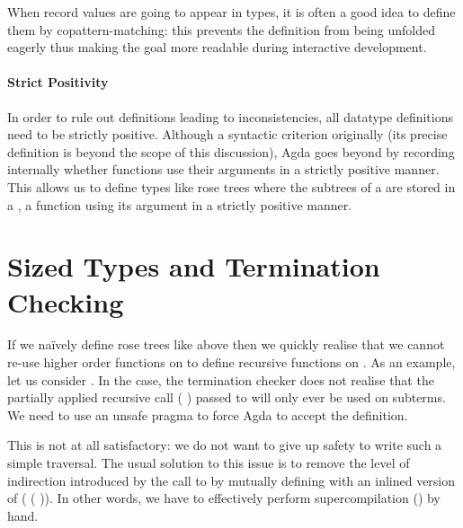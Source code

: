 
\begin{technique}
  When record values are going to appear in types, it is often a good idea to define
  them by copattern-matching: this prevents the definition from being unfolded eagerly
  thus making the goal more readable during interactive development.
\end{technique}

\paragraph{Strict Positivity} In order to rule out definitions leading to
inconsistencies, all datatype definitions need to be strictly positive.
Although a syntactic criterion originally (its precise definition is beyond
the scope of this discussion), Agda goes beyond by recording internally
whether functions use their arguments in a strictly positive manner.
This allows us to define types like rose trees where the subtrees of a
 are stored in a , a function using its 
argument in a strictly positive manner.


\section{Sized Types and Termination Checking}
\label{sec:sizetermination}

If we naïvely define rose trees like above then we quickly realise that we cannot
re-use higher order functions on  to define recursive functions on .
As an example, let us consider . In the  case,
the termination checker does not realise that the partially applied recursive call
( ) passed to 
will only ever be used on subterms. We need to use an unsafe  pragma
to force Agda to accept the definition.


This is not at all satisfactory: we do not want to give up safety to write such a
simple traversal. The usual solution to this issue is to remove the level of
indirection introduced by the call to  by mutually
defining with  an inlined version of
( ( )).
In other words, we have to effectively perform supercompilation
(\cite{mendelgleason2012}) by hand.

